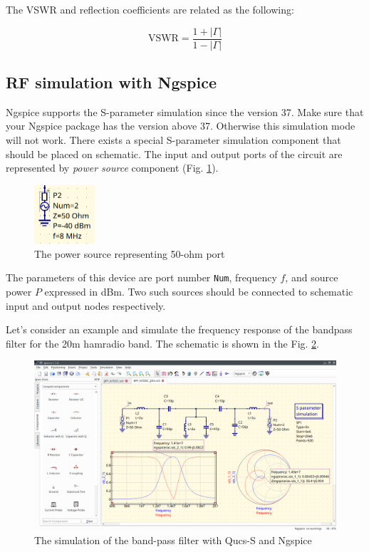 \documentclass[a4paper,12pt]{article}
\begin{document}
The VSWR and reflection coefficients are related as the following:

\begin{equation}
 \mathrm{VSWR} = \frac{1+|\Gamma|}{1-|\Gamma|}
\end{equation}

\subsection{RF simulation with Ngspice}

Ngspice supports the S-parameter simulation since the version 37. Make sure that your Ngspice package has the version above 37. Otherwise this simulation mode will not work. There exists a special S-parameter simulation component that should be placed on schematic. The input and output ports of the circuit are represented by \emph{power source} component (Fig. \ref{fig:port50}). 

    \begin{figure}[!ht]
    \begin{center}
        \includegraphics[width=0.2\textwidth]{img/port50.png}
    \end{center}
    \caption{The power source representing 50-ohm port} \label{fig:port50}
    \end{figure}
    
The parameters of this device are port number \verb|Num|, frequency $f$, and source power $P$ expressed in dBm. Two such sources should be connected to schematic input and output nodes respectively. 

Let's consider an example and simulate the frequency response of the bandpass filter for the 20m hamradio band. The schematic is shown in the Fig. \ref{fig:filt20m}. 

    \begin{figure}[!ht]
    \begin{center}
        \includegraphics[width=\textwidth]{img/filt20sim.png}
    \end{center}
    \caption{The simulation of the band-pass filter with Qucs-S and Ngspice} \label{fig:filt20m}
    \end{figure}
    
\end{document}
